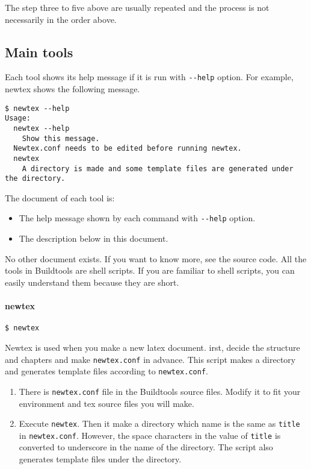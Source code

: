 The step three to five above are usually repeated and the process is not
necessarily in the order above.

\hypertarget{main-tools}{%
\subsection{Main tools}\label{main-tools}}

Each tool shows its help message if it is run with \texttt{-\/-help}
option. For example, newtex shows the following message.

\begin{verbatim}
$ newtex --help
Usage:
  newtex --help
    Show this message.
  Newtex.conf needs to be edited before running newtex.
  newtex
    A directory is made and some template files are generated under the directory.
\end{verbatim}

The document of each tool is:

\begin{itemize}
\tightlist
\item
  The help message shown by each command with \texttt{-\/-help} option.
\item
  The description below in this document.
\end{itemize}

No other document exists. If you want to know more, see the source code.
All the tools in Buildtools are shell scripts. If you are familiar to
shell scripts, you can easily understand them because they are short.

\hypertarget{newtex}{%
\paragraph{newtex}\label{newtex}}

\begin{verbatim}
$ newtex
\end{verbatim}

Newtex is used when you make a new latex document. irst, decide the
structure and chapters and make \texttt{newtex.conf} in advance. This
script makes a directory and generates template files according to
\texttt{newtex.conf}.

\begin{enumerate}
\def\labelenumi{\arabic{enumi}.}
\tightlist
\item
  There is \texttt{newtex.conf} file in the Buildtools source files.
  Modify it to fit your environment and tex source files you will make.
\item
  Execute \texttt{newtex}. Then it make a directory which name is the
  same as \texttt{title} in \texttt{newtex.conf}. However, the space
  characters in the value of \texttt{title} is converted to underscore
  in the name of the directory. The script also generates template files
  under the directory.
\end{enumerate}

